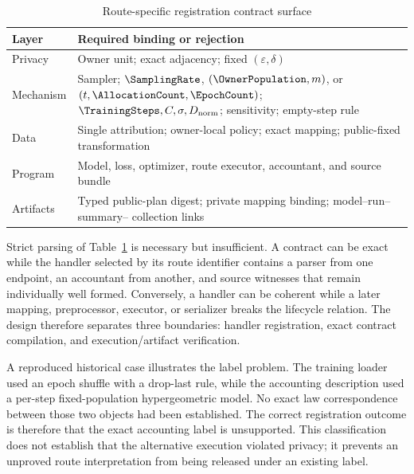 \begin{table}[tbp]
    \centering
    \caption{Route-specific registration contract surface}
    \label{tab:ch3-contract-surface}
    \small
    \setlength{\tabcolsep}{4pt}
    \renewcommand{\arraystretch}{1.16}
    \begin{tabular}{@{}
        >{\raggedright\arraybackslash}p{}
        >{\raggedright\arraybackslash}p{}@{}}
        \toprule
        \textbf{Layer} & \textbf{Required binding or rejection} \\
        \midrule
        Privacy &
        Owner unit; exact adjacency; fixed \((\varepsilon,\delta)\) \\

        Mechanism &
        Sampler; \(\SamplingRate\), \((\OwnerPopulation,m)\), or
        \((t,\AllocationCount,\EpochCount)\);
        \(\TrainingSteps,C,\sigma,D_{\mathrm{norm}}\); sensitivity;
        empty-step rule \\

        Data &
        Single attribution; owner-local policy; exact mapping;
        public-fixed transformation \\

        Program &
        Model, loss, optimizer, route executor, accountant, and source bundle \\

        Artifacts &
        Typed public-plan digest; private mapping binding; model--run--summary--
        collection links \\
        \bottomrule
    \end{tabular}
\end{table}

Strict parsing of Table~\ref{tab:ch3-contract-surface} is necessary but
insufficient.  A contract can be exact while the handler selected by its route
identifier contains a parser from one endpoint, an accountant from another, and
source witnesses that remain individually well formed.  Conversely, a handler can
be coherent while a later mapping, preprocessor, executor, or serializer breaks
the lifecycle relation.  The design therefore separates three boundaries:
handler registration, exact contract compilation, and execution/artifact
verification.

A reproduced historical case illustrates the label problem.  The training loader
used an epoch shuffle with a drop-last rule, while the accounting description used
a per-step fixed-population hypergeometric model.  No exact law correspondence
between those two objects had been established.  The correct registration outcome
is therefore that the exact accounting label is unsupported.  This classification
does not establish that the alternative execution violated privacy; it prevents an
unproved route interpretation from being released under an existing label.

